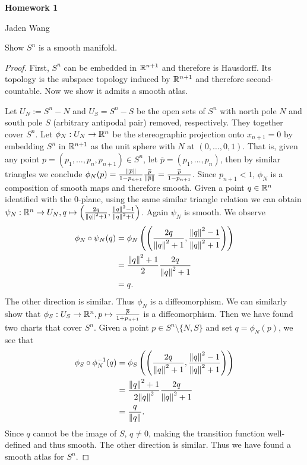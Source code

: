 \documentclass[12pt]{article}
\begin{document}
\centerline {\textsf{\textbf{\LARGE{Homework 1}}}}
\centerline {Jaden Wang}
\vspace{.15in}
\begin{problem}[4.1]
Show $ S^{n}$ is a smooth manifold.
\end{problem}
\begin{proof}
First, $ S^{n}$ can be embedded in $ \mathbb{R}^{n+1}$ and therefore is Hausdorff. Its topology is the subspace topology induced by $ \mathbb{R}^{n+1}$ and therefore second-countable. Now we show it admits a smooth atlas.

Let $ U_N := S^{n} - N$ and $ U_S = S^{n} - S$ be the open sets of $ S^{n}$ with north pole $ N$ and south pole $ S$ (arbitrary antipodal pair) removed, respectively. They together cover $ S^{n}$. Let $ \phi_N: U_N \to \mathbb{R}^{n}$ be the stereographic projection onto $ x_{n+1} =0$ by embedding $ S^{n}$ in $ \mathbb{R}^{n+1}$ as the unit sphere with $ N$ at $ (0,\ldots,0,1)$. That is, given any point $ p = (p_1, \ldots, p_n, p_{n+1}) \in S^{n}$, let $ \overline{p} = (p_1,\ldots,p_n)$, then by similar triangles we conclude $ \phi_N (p) = \frac{{\left\lVert{ \overline{p}}\right\rVert} }{ 1-p_{n+1}} \frac{\overline{p}}{ {\left\lVert{ \overline{p}}\right\rVert} } = \frac{ \overline{p} }{ 1- p_{n+1}}$. Since $ p_{n+1}<1$, $ \phi_N$ is a composition of smooth maps and therefore smooth. Given a point $ q \in \mathbb{R}^n$ identified with the 0-plane, using the same similar triangle relation we can obtain $ \psi_N: \mathbb{R}^{n} \to U_N, q \mapsto \left( \frac{2q}{{\left\lVert{ q}\right\rVert}^2+1 }, \frac{{\left\lVert{ q}\right\rVert}^2 -1 }{ {\left\lVert{ q}\right\rVert}^2 +1} \right) $. Again $ \psi_N$ is smooth. We observe
\begin{align*}
	\phi_N \circ \psi_N(q) &= \phi_N \left( \left( \frac{2q}{{\left\lVert{ q}\right\rVert}^2+1 }, \frac{{\left\lVert{ q}\right\rVert}^2 -1 }{ {\left\lVert{ q}\right\rVert}^2 +1} \right)\right)\\
	&= \frac{ {\left\lVert{ q}\right\rVert}^2+1 }{ 2} \frac{2q}{{\left\lVert{ q}\right\rVert}^2+1 }  \\
	&= q .
\end{align*}
The other direction is similar. Thus $ \phi_N$ is a diffeomorphism. We can similarly show that $ \phi_S: U_S \to \mathbb{R}^{n}, p \mapsto \frac{\overline{p}}{1+p_{n+1} }$ is a diffeomorphism. Then we have found two charts that cover  $ S^{n}$. Given a point $ p \in S^{n}\setminus \{N,S\} $ and set $ q = \phi_N(p)$, we see that
\begin{align*}
	\phi_S \circ \phi_N^{-1}(q) &=  \phi_S \left( \left( \frac{2q}{{\left\lVert{ q}\right\rVert}^2+1 }, \frac{{\left\lVert{ q}\right\rVert}^2 -1 }{ {\left\lVert{ q}\right\rVert}^2 +1} \right)\right)\\
				    &= \frac{ {\left\lVert{ q}\right\rVert}^2 +1 }{2 {\left\lVert{ q}\right\rVert}^2 } \frac{2q}{ {\left\lVert{ q}\right\rVert}^2+1 } \\
				    &= \frac{q}{{\left\lVert{ q}\right\rVert} } .
\end{align*}
Since $ q$ cannot be the image of  $ S$,  $ q \neq 0$, making the transition function well-defined and thus smooth. The other direction is similar. Thus we have found a smooth atlas for  $ S^{n}$.
\end{proof}
\end{document}
